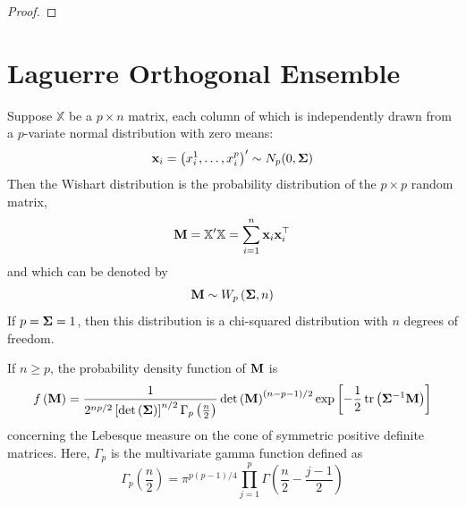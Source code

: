 \begin{proof}

\end{proof}

\section{Laguerre Orthogonal Ensemble}

\begin{definition}
	Suppose $\mathbb{X}$ be a $p\times n$ matrix, each column of which is independently drawn from a $p$-variate normal distribution with zero means:
	\begin{equation*}
		{\bf x}_{i}=\left(x_{i}^{1},\ldots,x_{i}^{p}\right)^{\prime}\sim N_{p}(0,\boldsymbol{\Sigma})
	\end{equation*}
	Then the Wishart distribution is the probability distribution of the $p\times p$ random matrix,
	\begin{equation}
		{\bf M}=\mathbb{X}^{\prime}\mathbb{X}=\sum_{i=1}^{n}{\bf x}_{i}{\bf x}_{i}^{\top}
	\end{equation}
	and which can be denoted by
	\begin{equation*}
		{\bf M}\sim W_{p}\left(\boldsymbol{\Sigma},n\right)
	\end{equation*}
	If $p=\boldsymbol{\Sigma}=1$, then this distribution is a chi-squared distribution with $n$ degrees of freedom.
\end{definition}

\begin{theorem}
	If $n\geq p$, the probability density function of ${\bf M}$ is
	\begin{equation}
		f\left({\bf M}\right)=\frac{1}{2^{np/2}\left[\operatorname{det}\left(\boldsymbol{\Sigma}\right)\right]^{n/2}\Gamma_{p}\left(\frac{n}{2}\right)}\operatorname{det}\left({\bf M}\right)^{(n-p-1)/2}\exp\left[-\frac{1}{2}\operatorname{tr}\left(\boldsymbol{\Sigma}^{-1}{\bf M}\right)\right]
		\label{eq:pdf-wishart}
	\end{equation}
	concerning the Lebesque measure on the cone of symmetric positive definite matrices. Here, $\Gamma_{p}$ is the multivariate gamma function defined as
	\begin{equation*}
		\Gamma_{p}\left(\frac{n}{2}\right)=\pi^{p(p-1)/4}\prod_{j=1}^{p}\Gamma\left(\frac{n}{2}-\frac{j-1}{2}\right)
	\end{equation*}
\end{theorem}

